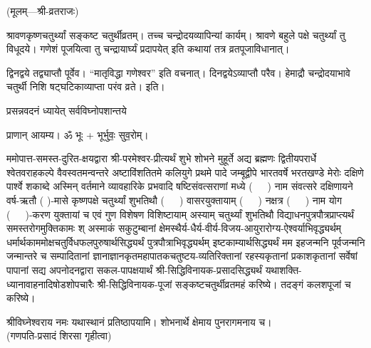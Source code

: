 
\setlength{\parindent}{0pt}
\centerline{\small{(मूलम्—श्री-व्रतराजः)}}

श्रावणकृष्णचतुर्थ्यां सङ्कष्ट चतुर्थीव्रतम्। तच्च चन्द्रोदयव्यापिन्यां कार्यम्। श्रावणे बहुले पक्षे चतुर्थ्यां तु विधूदये। गणेशं पूजयित्वा तु चन्द्रायार्घ्यं प्रदापयेत् इति कथायां तत्र व्रतपूजाविधानात्।

द्विनद्वये तद्व्याप्तौ पूर्वेव। “मातृविद्धा गणेश्वर” इति वचनात्। दिनद्वयेऽव्याप्तौ परैव। हेमाद्रौ चन्द्रोदयाभावे चतुर्थी निशि षट्घटिकाव्याप्ता परंव व्रते।
इति।




{प्रसन्नवदनं ध्यायेत् सर्वविघ्नोपशान्तये}

प्राणान् आयम्य। ॐ भूः + भूर्भुवः॒ सुव॒रोम्।


ममोपात्त-समस्त-दुरित-क्षयद्वारा श्री-परमेश्वर-प्रीत्यर्थं शुभे शोभने मुहूर्ते अद्य ब्रह्मणः
द्वितीयपरार्धे श्वेतवराहकल्पे वैवस्वतमन्वन्तरे अष्टाविंशतितमे कलियुगे प्रथमे पादे
जम्बूद्वीपे भारतवर्षे भरतखण्डे मेरोः दक्षिणे पार्श्वे शकाब्दे अस्मिन् वर्तमाने व्यावहारिके
प्रभवादि षष्टिसंवत्सराणां मध्ये \mbox{(~~~)} नाम संवत्सरे दक्षिणायने 
वर्ष-ऋतौ ( )-मासे कृष्णपक्षे चतुर्थ्यां शुभतिथौ \mbox{(~~~)} वासरयुक्तायाम्
\mbox{(~~~)} नक्षत्र \mbox{(~~~)} नाम योग 
\mbox{(~~~)}-करण युक्तायां च एवं गुण विशेषण विशिष्टायाम्
अस्याम् चतुर्थ्यां शुभतिथौ 
विद्याधनपुत्रपौत्रप्राप्त्यर्थं समस्तरोगमुक्तिकामः श्
अस्माकं सकुटुम्बानां क्षेमस्थैर्य-धैर्य-वीर्य-विजय-आयुरारोग्य-ऐश्वर्याभिवृद्ध्यर्थम्
धर्मार्थकाममोक्ष\-चतुर्विधफलपुरुषार्थसिद्ध्यर्थं पुत्रपौत्राभि\-वृद्ध्यर्थम् इष्टकाम्यार्थसिद्ध्यर्थं
मम इहजन्मनि पूर्वजन्मनि जन्मान्तरे च सम्पादितानां ज्ञानाज्ञानकृतमहा\-पातकचतुष्टय-व्यतिरिक्तानां 
रहस्यकृतानां प्रकाशकृतानां सर्वेषां पापानां सद्य अपनोदनद्वारा 
सकल-पापक्षयार्थं श्री-सिद्धिविनायक-प्रसादसिद्ध्यर्थं 
यथाशक्ति-ध्यानावाहनादिषोडशोपचारैः श्री-सिद्धिविनायक-पूजां सङ्कष्टचतुर्थीव्रतमहं करिष्ये। तदङ्गं कलशपूजां च करिष्ये। 

श्रीविघ्नेश्वराय नमः यथास्थानं प्रतिष्ठापयामि। शोभनार्थे क्षेमाय पुनरागमनाय च।\\
(गणपति-प्रसादं शिरसा गृहीत्वा)

